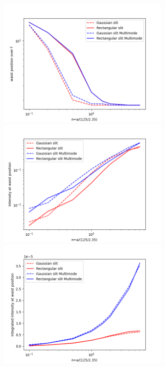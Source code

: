 \documentclass{iucr}              %
\begin{document}
\begin{figure}
    \flushleft
    \centering
    \includegraphics[width=0.75\textwidth]{figures/FigureW1.png}
    \includegraphics[width=0.75\textwidth]{figures/FigureW2.png}
    \flushleft
    \centering
    \includegraphics[width=0.75\textwidth]{figures/FigureW3.png}

\end{figure}
\end{document}
